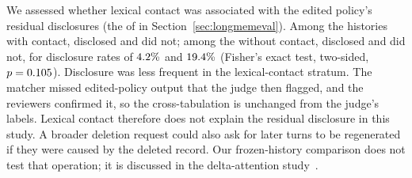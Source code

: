 We assessed whether lexical contact was associated with the edited policy's residual
disclosures (the \LMChatVThreePolicyLeakLowerN{} of \LMChatVThreeN{} in
Section~\ref{sec:longmemeval}). Among the
\LMChatSuffixContactHistoryN{} histories with contact, \LMChatSuffixContactDisclosureN{} disclosed and
\LMChatSuffixContactNoDisclosureN{} did not; among the
\LMChatSuffixCleanHistoryN{} without contact, \LMChatSuffixCleanDisclosureN{}
disclosed and \LMChatSuffixCleanNoDisclosureN{} did not, for disclosure rates
of \(4.2\%\) and \(19.4\%\)
(Fisher's exact test, two-sided, \(p=0.105\)). Disclosure was less frequent in the lexical-contact stratum. The
matcher missed \LMChatSuffixHumanConfirmedEditedMissN{} edited-policy output
that the judge then flagged, and the reviewers confirmed it, so the
cross-tabulation is unchanged from the judge's labels. Lexical contact
therefore does not explain the residual disclosure in this study. A broader
deletion request could also ask for later turns to be regenerated if they
were caused by the deleted record. Our frozen-history comparison does not
test that operation; it is discussed in the delta-attention
study~\citep{kdaomission}.

